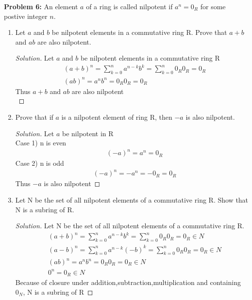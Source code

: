 \documentclass[12pt]{article}
\begin{document}
\newpage 
\noindent \textbf{Problem 6: } An element $a$ of a ring is called nilpotent if $a^n = 0_R$ for some postive integer $n$.
	\begin{enumerate}[label = (\alph*)]
		\item Let $a$ and $b$ be nilpotent elements in a commutative ring R. Prove that $a + b$ and $ab$ are also nilpotent.
		\begin{proof}[Solution]
			Let $a$ and $b$ be nilpotent elements in a commutative ring R
			\begin{align*}
				&(a + b)^n = \sum_{k = 0}^{n} a^{n-k}b^k = \sum_{k = 0}^{n} 0_R 0_R = 0_R \\
				&(ab)^n = a^nb^n = 0_R0_R = 0_R
			\end{align*}
			Thus $a + b$ and $ab$ are also nilpotent \\
		\end{proof}
		\item Prove that if $a$ is a nilpotent element of ring R, then $-a$ is also nilpotent.
			\begin{proof}[Solution]
				Let $a$ be nilpotent in R \\
				Case 1) n is even 
				\begin{align*}
					&(-a)^n = a^n = 0_R
				\end{align*}
				Case 2) n is odd
				\begin{align*}
					&(-a)^n = -a^n = -0_R = 0_R
				\end{align*}
				Thus $-a$ is also nilpotent
			\end{proof} 
		\item Let N be the set of all nilpotent elements of a commutative ring R. Show that N is a subring of R.
			\begin{proof}[Solution]
				Let N be the set of all nilpotent elements of a commutative ring R.
				\begin{align*}
					&(a + b)^n = \sum_{k = 0}^{n} a^{n-k}b^k = \sum_{k = 0}^{n} 0_R 0_R = 0_R \in N \\
					&(a - b)^n = \sum_{k = 0}^{n} a^{n-k}(-b)^k = \sum_{k = 0}^{n} 0_R 0_R = 0_R \in N\\
					&(ab)^n = a^nb^n = 0_R0_R = 0_R \in N \\
					&0^n = 0_R \in N
				\end{align*} 
				Because of closure under addition,subtraction,multiplication and containing $0_N$, N is a subring of R
			\end{proof}
	\end{enumerate}
\end{document}
